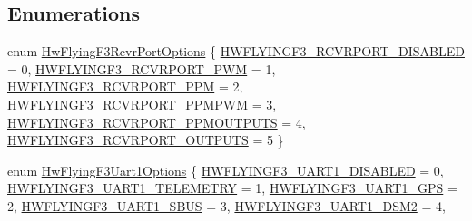 \subsection*{\-Enumerations}
\begin{DoxyCompactItemize}
\item 
enum \hyperlink{group___hw_flying_f3_ga88bf7e07b0ce8f28428b09cfe6bb022f}{\-Hw\-Flying\-F3\-Rcvr\-Port\-Options} \{ \*
\hyperlink{group___hw_flying_f3_gga88bf7e07b0ce8f28428b09cfe6bb022faa0e725b87725710b3e8a5c010f2e0ea0}{\-H\-W\-F\-L\-Y\-I\-N\-G\-F3\-\_\-\-R\-C\-V\-R\-P\-O\-R\-T\-\_\-\-D\-I\-S\-A\-B\-L\-E\-D} = 0, 
\hyperlink{group___hw_flying_f3_gga88bf7e07b0ce8f28428b09cfe6bb022fa83db366144bc7f1d49dce4a1833efdb3}{\-H\-W\-F\-L\-Y\-I\-N\-G\-F3\-\_\-\-R\-C\-V\-R\-P\-O\-R\-T\-\_\-\-P\-W\-M} = 1, 
\hyperlink{group___hw_flying_f3_gga88bf7e07b0ce8f28428b09cfe6bb022faad87f727ee49fa1f38c6da4fb2231946}{\-H\-W\-F\-L\-Y\-I\-N\-G\-F3\-\_\-\-R\-C\-V\-R\-P\-O\-R\-T\-\_\-\-P\-P\-M} = 2, 
\hyperlink{group___hw_flying_f3_gga88bf7e07b0ce8f28428b09cfe6bb022fa67df0fcd2e2f82415e3ec64e5d6d4c14}{\-H\-W\-F\-L\-Y\-I\-N\-G\-F3\-\_\-\-R\-C\-V\-R\-P\-O\-R\-T\-\_\-\-P\-P\-M\-P\-W\-M} = 3, 
\*
\hyperlink{group___hw_flying_f3_gga88bf7e07b0ce8f28428b09cfe6bb022fa7a1aa76431657f259b8402b4a46a8a17}{\-H\-W\-F\-L\-Y\-I\-N\-G\-F3\-\_\-\-R\-C\-V\-R\-P\-O\-R\-T\-\_\-\-P\-P\-M\-O\-U\-T\-P\-U\-T\-S} = 4, 
\hyperlink{group___hw_flying_f3_gga88bf7e07b0ce8f28428b09cfe6bb022fa930850b70f5be1407e5b4c746da45973}{\-H\-W\-F\-L\-Y\-I\-N\-G\-F3\-\_\-\-R\-C\-V\-R\-P\-O\-R\-T\-\_\-\-O\-U\-T\-P\-U\-T\-S} = 5
 \}
\item 
enum \hyperlink{group___hw_flying_f3_ga53a817018f6bec1239e60888965b6990}{\-Hw\-Flying\-F3\-Uart1\-Options} \{ \*
\hyperlink{group___hw_flying_f3_gga53a817018f6bec1239e60888965b6990a07505684de90ed1a0c1627351a36c3be}{\-H\-W\-F\-L\-Y\-I\-N\-G\-F3\-\_\-\-U\-A\-R\-T1\-\_\-\-D\-I\-S\-A\-B\-L\-E\-D} = 0, 
\hyperlink{group___hw_flying_f3_gga53a817018f6bec1239e60888965b6990afe7f862ad8ad014fb29c154aa8b7825f}{\-H\-W\-F\-L\-Y\-I\-N\-G\-F3\-\_\-\-U\-A\-R\-T1\-\_\-\-T\-E\-L\-E\-M\-E\-T\-R\-Y} = 1, 
\hyperlink{group___hw_flying_f3_gga53a817018f6bec1239e60888965b6990acdad390010a0610d18ccd2f9725a37e6}{\-H\-W\-F\-L\-Y\-I\-N\-G\-F3\-\_\-\-U\-A\-R\-T1\-\_\-\-G\-P\-S} = 2, 
\hyperlink{group___hw_flying_f3_gga53a817018f6bec1239e60888965b6990ae0f6839df2aed1f1a7027265ba637849}{\-H\-W\-F\-L\-Y\-I\-N\-G\-F3\-\_\-\-U\-A\-R\-T1\-\_\-\-S\-B\-U\-S} = 3, 
\*
\hyperlink{group___hw_flying_f3_gga53a817018f6bec1239e60888965b6990aa354e2f7dd7f15ae0fb07274623075d3}{\-H\-W\-F\-L\-Y\-I\-N\-G\-F3\-\_\-\-U\-A\-R\-T1\-\_\-\-D\-S\-M2} = 4, 

\end{DoxyCompactItemize}
